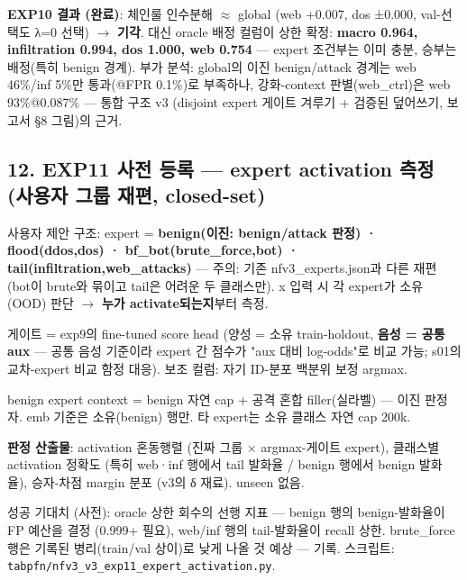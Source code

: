 \textbf{EXP10 결과 (완료)}: 체인룰 인수분해 \ensuremath{\approx} global (web +\allowbreak{}0.007, dos ±0.000, val-선택도 λ=\allowbreak{}0 선택)  \ensuremath{\rightarrow}  \textbf{기각}. 대신 oracle 배정 컬럼이 상한 확정: \textbf{macro 0.964, infiltration 0.994, dos 1.000, web 0.754} — expert 조건부는 이미 충분, 승부는 배정(특히 benign 경계). 부가 분석: global의 이진 benign/\allowbreak{}attack 경계는 web 46\%/\allowbreak{}inf 5\%만 통과(@FPR 0.1\%)로 부족하나, 강화-context 판별(web\_\allowbreak{}ctrl)은 web 93\%@0.087\% — 통합 구조 v3 (disjoint expert 게이트 겨루기 +\allowbreak{} 검증된 덮어쓰기, 보고서 §8 그림)의 근거.

\subsection{12. EXP11 사전 등록 — expert activation 측정 (사용자 그룹 재편, closed-set)}
사용자 제안 구조: expert =\allowbreak{} \textbf{benign(이진: benign/\allowbreak{}attack 판정) · flood(ddos,dos) · bf\_\allowbreak{}bot(brute\_\allowbreak{}force,bot) · tail(infiltration,web\_\allowbreak{}attacks)} — 주의: 기존 nfv3\_\allowbreak{}experts.json과 다른 재편 (bot이 brute와 묶이고 tail은 어려운 두 클래스만). x 입력 시 각 expert가 소유(OOD) 판단  \ensuremath{\rightarrow}  \textbf{누가 activate되는지}부터 측정.

\par\noindent \textbullet\enspace 게이트 =\allowbreak{} exp9의 fine-tuned score head (양성 =\allowbreak{} 소유 train-holdout, \textbf{음성 =\allowbreak{} 공통 aux} — 공통 음성 기준이라 expert 간 점수가 "aux 대비 log-odds"로 비교 가능; s01의 교차-expert 비교 함정 대응). 보조 컬럼: 자기 ID-분포 백분위 보정 argmax.


\par\noindent \textbullet\enspace benign expert context =\allowbreak{} benign 자연 cap +\allowbreak{} 공격 혼합 filler(실라벨) — 이진 판정자. emb 기준은 소유(benign) 행만. 타 expert는 소유 클래스 자연 cap 200k.


\par\noindent \textbullet\enspace \textbf{판정 산출물}: activation 혼동행렬 (진짜 그룹 × argmax-게이트 expert), 클래스별 activation 정확도 (특히 web·inf 행에서 tail 발화율 /\allowbreak{} benign 행에서 benign 발화율), 승자-차점 margin 분포 (v3의 δ 재료). unseen 없음.


\par\noindent \textbullet\enspace 성공 기대치 (사전): oracle 상한 회수의 선행 지표 — benign 행의 benign-발화율이 FP 예산을 결정 (0.999+\allowbreak{} 필요), web/\allowbreak{}inf 행의 tail-발화율이 recall 상한. brute\_\allowbreak{}force 행은 기록된 병리(train/\allowbreak{}val 상이)로 낮게 나올 것 예상 — 기록. 스크립트: \texttt{tabpfn/\allowbreak{}\allowbreak{}n\allowbreak{}fv3\_\allowbreak{}\allowbreak{}v3\_\allowbreak{}\allowbreak{}e\allowbreak{}xp11\_\allowbreak{}\allowbreak{}exp\allowbreak{}ert\_\allowbreak{}\allowbreak{}acti\allowbreak{}vation.\allowbreak{}p\allowbreak{}y}.


